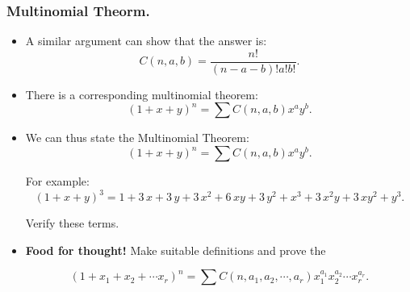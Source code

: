 
\begin{frame}%
  \frametitle{Multinomial Theorm.}
  \begin{itemize}%

\item A similar argument can show that the answer is:
$$C(n,a,b)=\frac{n!}{(n-a-b)!a!b!}.$$

\item There is a corresponding multinomial theorem:
$$(1+x+y)^n = \sum C(n,a,b)x^ay^b .$$

\item We can thus state the Multinomial Theorem:
$$(1+x+y)^n = \sum C(n,a,b)x^ay^b.$$

For example:
$$(1+x+y)^3 = 1+3\,x+3\,y+3\,{x}^{2}+6\,xy+3\,{y}^{2}+{x}^{3}+3\,{x}^{2}y+3\,x{y}^{2
}+{y}^{3}.$$

Verify these terms.

\item {\bf Food for thought!} Make suitable definitions and prove the

$$(1+x_1+x_2+\cdots x_r )^n = \sum C(n,a_1,a_2,\cdots
,a_r)x_1^{a_1}x_2^{a_2}\cdots x_r^{a_r}.$$




\end{itemize}
\end{frame}


